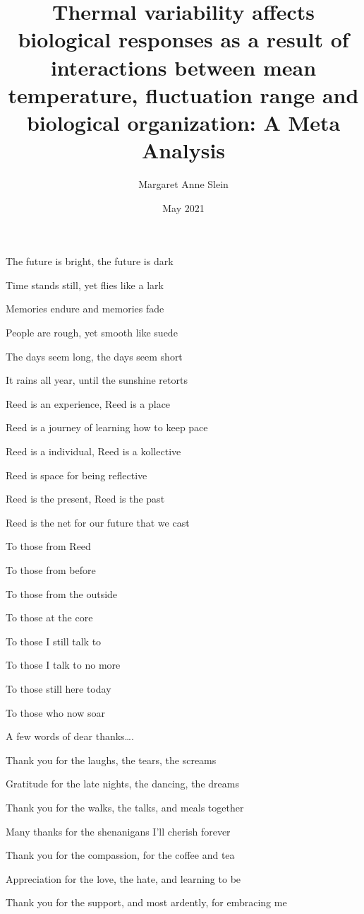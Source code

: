 \documentclass[12pt,twoside]{reedthesis}
\title{Thermal variability affects biological responses as a result of interactions between mean temperature, fluctuation range and biological organization: A Meta Analysis}
\author{Margaret Anne Slein}
\date{May 2021}
\begin{document}
  \maketitle

\frontmatter %
\pagestyle{empty} %
  \begin{acknowledgements}
    The future is bright, the future is dark
    
    Time stands still, yet flies like a lark
    
    Memories endure and memories fade
    
    People are rough, yet smooth like suede
    
    The days seem long, the days seem short
    
    It rains all year, until the sunshine retorts
    
    Reed is an experience, Reed is a place
    
    Reed is a journey of learning how to keep pace
    
    Reed is a individual, Reed is a kollective
    
    Reed is space for being reflective
    
    Reed is the present, Reed is the past
    
    Reed is the net for our future that we cast
    
    To those from Reed
    
    To those from before
    
    To those from the outside
    
    To those at the core
    
    To those I still talk to
    
    To those I talk to no more
    
    To those still here today
    
    To those who now soar
    
    A few words of dear thanks\ldots{}.
    
    Thank you for the laughs, the tears, the screams
    
    Gratitude for the late nights, the dancing, the dreams
    
    Thank you for the walks, the talks, and meals together
    
    Many thanks for the shenanigans I'll cherish forever
    
    Thank you for the compassion, for the coffee and tea
    
    Appreciation for the love, the hate, and learning to be
    
    Thank you for the support, and most ardently, for embracing me
  \end{acknowledgements}
\end{document}
